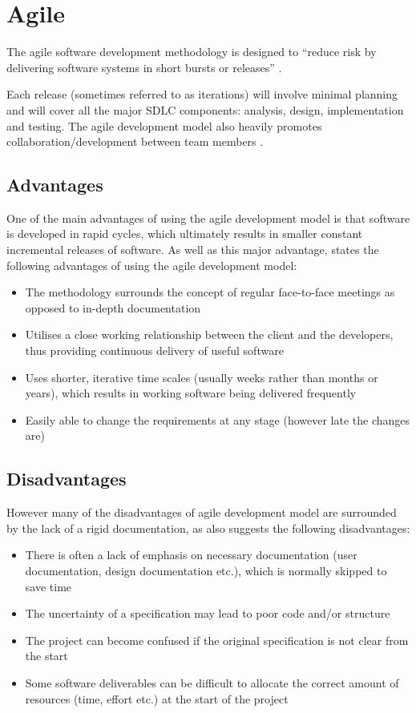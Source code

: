 \section{Agile}

The agile software development methodology is designed to ``reduce risk by 
delivering software systems in short bursts or releases'' \citep{dawson09}.

Each release (sometimes referred to as iterations) will involve minimal 
planning and will cover all the major SDLC components: analysis, design, 
implementation and testing. The agile development model also heavily promotes 
collaboration/development between team members \citep{dawson09}. 


\subsection{Advantages}

One of the main advantages of using the agile development model is that 
software is developed in rapid cycles, which ultimately results in smaller 
constant incremental releases of software. As well as this major advantage, 
\citet{dawson09} states the following advantages of using the agile development 
model:

\begin{itemize}
  \item The methodology surrounds the concept of regular face-to-face meetings 
  as opposed to in-depth documentation
  \item Utilises a close working relationship between the client and the 
  developers, thus providing continuous delivery of useful software
  \item Uses shorter, iterative time scales (usually weeks rather than months 
  or years), which results in working software being delivered frequently
  \item Easily able to change the requirements at any stage (however late the 
  changes are)
\end{itemize}


\subsection{Disadvantages}

However many of the disadvantages of agile development model are surrounded by 
the lack of a rigid documentation, as \citet{dawson09} also suggests the following 
disadvantages:

\begin{itemize}
  \item There is often a lack of emphasis on necessary documentation (user 
  documentation, design documentation etc.), which is normally skipped to save 
  time
  \item The uncertainty of a specification may lead to poor code and/or 
  structure
  \item The project can become confused if the original specification is not 
  clear from the start
  \item Some software deliverables can be difficult to allocate the correct 
  amount of resources (time, effort etc.) at the start of the project
\end{itemize}
